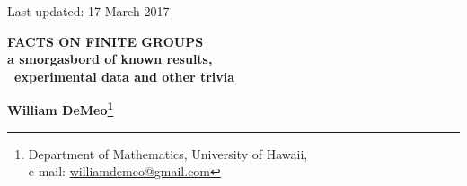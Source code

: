 

   



\thispagestyle{empty}

\begin{flushright}
\vspace*{-1.1cm} {{\small \sffamily Last updated: 17 March 2017}}
\end{flushright}
\vspace{0.8cm}
\begin{center}
  {\large \bf FACTS ON FINITE GROUPS\\a smorgasbord of known results,\\ ~experimental data and other trivia
} \vspace*{3mm}


{\bf William DeMeo\footnote{Department of Mathematics, University of Hawaii,\\
    e-mail: \href{mailto:williamdemeo@gmail.com}{williamdemeo@gmail.com}}}
\end{center}

\begin{abstract}
  This is a rough and unpolished collection of potentially useful facts
  about finite groups, most of which are well known. Much of this information
  is collected from disperate unpublished seminar notes that I compiled as a
  graduate student.  Many of these facts were checked (and often discovered)
  using the \GAP software.  However, some parts were not checked with
  \GAP and might contain errors. Please send any feedback 
  to the author at \url{williamdemeo@gmail.com}.
  
  One reason to collect these notes in a single document and make them publicly
  available is in response to email requests from people who wish to cite some of
  my notes in publications.  With this purpose in mind, the BibTeX data for
  citing this document appears on the last page below.
\end{abstract}

